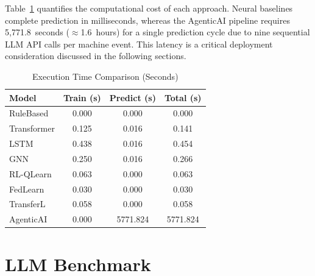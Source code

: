 Table~\ref{tab:exec_t} quantifies the computational cost of each approach. Neural baselines complete prediction in milliseconds, whereas the AgenticAI pipeline requires 5,771.8~seconds ($\approx$1.6~hours) for a single prediction cycle due to nine sequential LLM API calls per machine event. This latency is a critical deployment consideration discussed in the following sections.
\begin{table}[!htbp]
\centering
\caption{Execution Time Comparison (Seconds)}
\label{tab:exec_t}
\begin{tabular}{lccc}
\hline
\textbf{Model} & \textbf{Train (s)} & \textbf{Predict (s)} & \textbf{Total (s)} \\
\hline
RuleBased  & 0.000 & 0.000 & 0.000 \\
Transformer& 0.125 & 0.016 & 0.141 \\
LSTM       & 0.438 & 0.016 & 0.454 \\
GNN        & 0.250 & 0.016 & 0.266 \\
RL-QLearn  & 0.063 & 0.000 & 0.063 \\
FedLearn   & 0.030 & 0.000 & 0.030 \\
TransferL  & 0.058 & 0.000 & 0.058 \\
AgenticAI  & 0.000 & 5771.824 & 5771.824 \\
\hline
\end{tabular}
\end{table}
\section{LLM Benchmark}
\label{sec:llm_benchmark}

